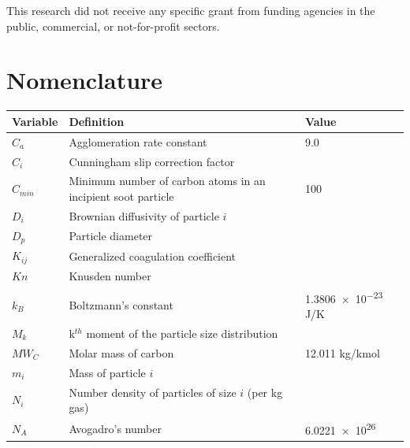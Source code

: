 \documentclass[preprint,letterpaper]{elsarticle}
\begin{document}
This research did not receive any specific grant from funding agencies in the public, commercial, or not-for-profit sectors.


\section*{Nomenclature}
\label{s:nomenclature}

\noindent
{\small
\begin{tabularx}{\textwidth}{l >{\raggedright\arraybackslash}X l}
    \hline
    Variable        & Definition                               & Value \\
    \hline \hline
    $C_a$           & Agglomeration rate constant               & 9.0  \\
    $C_i$           & Cunningham slip correction factor         & \\
    $C_{min}$       & Minimum number of carbon atoms in an incipient soot particle & 100 \\
    $D_i$           & Brownian diffusivity of particle $i$      & \\       %
    $D_{p}$         & Particle diameter                         & \\       %
    $K_{ij}$        & Generalized coagulation coefficient       & \\        %
    $Kn$            & Knusden number                            & \\
    $k_B$           & Boltzmann's constant                      & \num{1.3806e-23} \si{J/K} \\
    $M_k$           & k$^{th}$ moment of the particle size distribution & \\  %
    $MW_C$          & Molar mass of carbon                      & 12.011 \si{kg/kmol} \\
    $m_i$           & Mass of particle $i$                      & \\    %
    $N_i$           & Number density of particles of size $i$ (per \si{kg} gas)  & \\   %
    $N_A$           & Avogadro's number                         & \num{6.0221e26} \\

\end{tabularx}}
\end{document}
